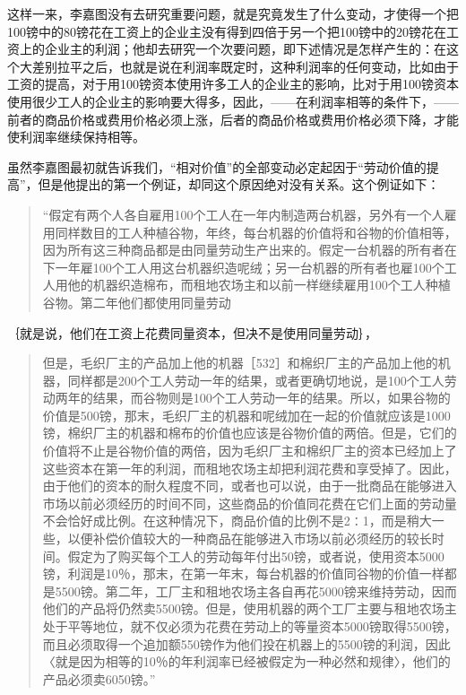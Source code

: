 这样一来，李嘉图没有去研究重要问题，就是究竟发生了什么变动，才使得一个把100镑中的80镑花在工资上的企业主没有得到四倍于另一个把100镑中的20镑花在工资上的企业主的利润；他却去研究一个次要问题，即下述情况是怎样产生的：在这个大差别拉平之后，也就是说在利润率既定时，这种利润率的任何变动，比如由于工资的提高，对于用100镑资本使用许多工人的企业主的影响，比对于用100镑资本使用很少工人的企业主的影响要大得多，因此，——在利润率相等的条件下，——前者的商品价格或费用价格必须上涨，后者的商品价格或费用价格必须下降，才能使利润率继续保持相等。

虽然李嘉图最初就告诉我们，“相对价值”的全部变动必定起因于“劳动价值的提高”，但是他提出的第一个例证，却同这个原因绝对没有关系。这个例证如下：

\begin{quote}{“假定有两个人各自雇用100个工人在一年内制造两台机器，另外有一个人雇用同样数目的工人种植谷物，年终，每台机器的价值将和谷物的价值相等，因为所有这三种商品都是由同量劳动生产出来的。假定一台机器的所有者在下一年雇100个工人用这台机器织造呢绒；另一台机器的所有者也雇100个工人用他的机器织造棉布，而租地农场主和以前一样继续雇用100个工人种植谷物。第二年他们都使用同量劳动}\end{quote}

｛就是说，他们在工资上花费同量资本，但决不是使用同量劳动｝，

\begin{quote}{但是，毛织厂主的产品加上他的机器［532］和棉织厂主的产品加上他的机器，同样都是200个工人劳动一年的结果，或者更确切地说，是100个工人劳动两年的结果，而谷物则是100个工人劳动一年的结果。所以，如果谷物的价值是500镑，那末，毛织厂主的机器和呢绒加在一起的价值就应该是1000镑，棉织厂主的机器和棉布的价值也应该是谷物价值的两倍。但是，它们的价值将不止是谷物价值的两倍，因为毛织厂主和棉织厂主的资本已经加上了这些资本在第一年的利润，而租地农场主却把利润花费和享受掉了。因此，由于他们的资本的耐久程度不同，或者也可以说，由于一批商品在能够进入市场以前必须经历的时间不同，这些商品的价值同花费在它们上面的劳动量不会恰好成比例。在这种情况下，商品价值的比例不是2∶1，而是稍大一些，以便补偿价值较大的一种商品在能够进入市场以前必须经历的较长时间。假定为了购买每个工人的劳动每年付出50镑，或者说，使用资本5000镑，利润是10％，那末，在第一年末，每台机器的价值同谷物的价值一样都是5500镑。第二年，工厂主和租地农场主各自再花5000镑来维持劳动，因而他们的产品将仍然卖5500镑。但是，使用机器的两个工厂主要与租地农场主处于平等地位，就不仅必须为花费在劳动上的等量资本5000镑取得5500镑，而且必须取得一个追加额550镑作为他们投在机器上的5500镑的利润，因此〈就是因为相等的10％的年利润率已经被假定为一种必然和规律〉，他们的产品必须卖6050镑。”}\end{quote}

